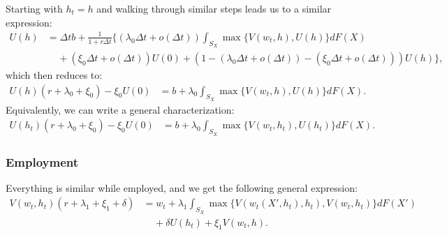 \documentclass[11pt]{article}
\begin{document}
Starting with $h_t = h$ and walking through similar steps leads us to a
similar expression:
\begin{align*}
        U(h) &= \Delta t b + \frac{1}{1+r\Delta t}\{
            (\lambda_0 \Delta t +o(\Delta t)) \int_{S_X}^{} \max \{V(w_t,
            h), U(h)\} dF(X) \\
             &\;\;\;\;+ (\xi_0\Delta t +o(\Delta t)) U(0) + (1 - (\lambda_0\Delta t +
    o(\Delta t)) - (\xi_0\Delta t + o(\Delta t))) U(h) \}
,\end{align*}
which then reduces to:
\begin{align*}
    U(h)(r+\lambda_0+\xi_0) - \xi_0 U(0) &= b + \lambda_0 \int_{S_X}^{} \max \{V(w_t,
            h), U(h)\} dF(X)
.\end{align*}
Equivalently, we can write a general characterization:
\begin{align*}
    U(h_t)(r+\lambda_0+\xi_0) - \xi_0 U(0) &= b + \lambda_0 \int_{S_X}^{} \max \{V(w_t,
            h_t), U(h_t)\} dF(X)
.\end{align*}



\subsubsection[Employment]{Employment}%
\label{subsub:employment}

Everything is similar while employed, and we get the following general
expression:
\begin{align*}
    V(w_t,h_t)(r+\lambda_1+\xi_1+\delta) &= w_t + \lambda_1
    \int_{S_X}^{} \max \{V(w_t(X',h_t),h_t), V(w_t,h_t)\} dF(X') \\
    &\;\;\;\; + \delta U(h_t) + \xi_1 V(w_t,h)
.\end{align*}
\end{document}
